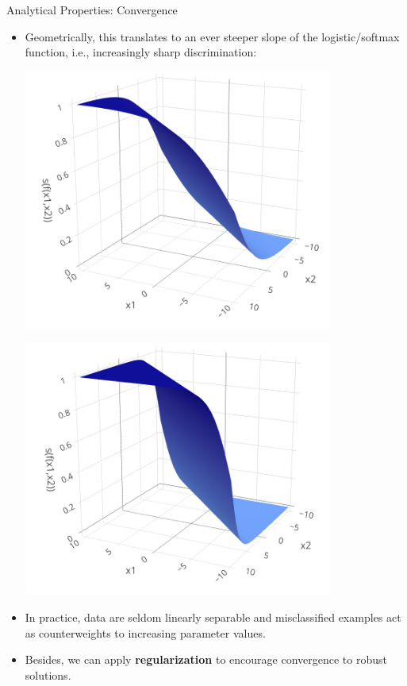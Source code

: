 \documentclass[11pt,compress,t,notes=noshow, xcolor=table]{beamer}
\begin{document}
\begin{vbframe}{Analytical Properties: Convergence}
\framebreak

\begin{itemize}
  \small
  \item
  Geometrically, this translates to an ever steeper slope of the 
  logistic/softmax function, i.e., increasingly sharp discrimination:
  
  \vspace{0.3cm}
  \begin{minipage}[b]{0.5\textwidth}
    \includegraphics[width=0.8\textwidth]{figure/softmax_1}
  \end{minipage}%
  \begin{minipage}[b]{0.5\textwidth}
    \includegraphics[width=0.8\textwidth]{figure/softmax_2}
  \end{minipage}%
  \item In practice, data are seldom linearly separable and misclassified 
  examples act as counterweights to increasing parameter values.
  \item Besides, we can apply \textbf{regularization} to encourage convergence 
  to robust solutions.
\end{itemize}

\end{vbframe}
\end{document}
